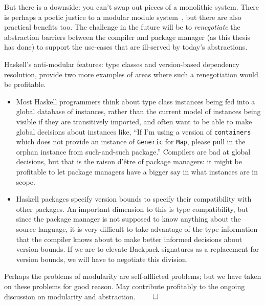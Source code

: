 But there is a downside: you can't swap out pieces of a monolithic
system.  There is perhaps a poetic justice to a modular module
system~\cite{leroy:modular}, but there are also practical benefits too.
The challenge in the future will be to \emph{renegotiate} the abstraction
barriers between the compiler and package manager (as this thesis has done)
to support the use-cases that are ill-served by today's abstractions.

Haskell's anti-modular features: type classes and version-based dependency
resolution, provide two more examples of areas where such a renegotiation would
be profitable.

\begin{itemize}
    \item Most Haskell programmers think about type class instances being
    fed into a global database of instances, rather than the current model
    of instances being visible if they are transitively imported, and often
    want to be able to make global decisions about instances like, ``If I'm
    using a version of \verb|containers| which does not provide an instance
    of \verb|Generic| for \verb|Map|, please pull in the orphan instance from
    such-and-such package.''  Compilers are bad at global decisions, but
    that is the raison d'\^etre of package managers:
    it might be profitable to let package managers have a bigger say in
    what instances are in scope.

    \item Haskell packages specify version bounds to specify their compatibility
    with other packages.  An important dimension to this is type compatibility,
    but since the package manager is not supposed to know anything about
    the source language, it is very difficult to take advantage of the type information
    that the compiler knows about to make better informed decisions about version
    bounds.  If we are to elevate Backpack signatures as a replacement for
    version bounds, we will have to negotiate this division.
\end{itemize}
%
Perhaps the problems of modularity are self-afflicted problems; but we have
taken on these problems for good reason.  May \Backpack{} contribute profitably to the
ongoing discussion on modularity and abstraction. $\qed$
